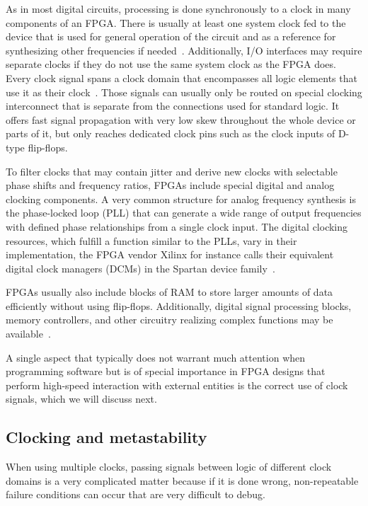 \documentclass[a4paper, 11pt, oneside]{Thesis}  %
\begin{document}
As in most digital circuits, processing is done synchronously to a clock in many components of an FPGA. There is usually at least one system clock fed to the device that is used for general operation of the circuit and as a reference for synthesizing other frequencies if needed~\cite{DigSysDesign}. Additionally, I/O interfaces may require separate clocks if they do not use the same system clock as the FPGA does. Every clock signal spans a clock domain that encompasses all logic elements that use it as their clock~\cite{AdvFPGA}. Those signals can usually only be routed on special clocking interconnect that is separate from the connections used for standard logic. It offers fast signal propagation with very low skew throughout the whole device or parts of it, but only reaches dedicated clock pins such as the clock inputs of D-type flip-flops.

To filter clocks that may contain jitter and derive new clocks with selectable phase shifts and frequency ratios, FPGAs include special digital and analog clocking components. A very common structure for analog frequency synthesis is the phase-locked loop (PLL) that can generate a wide range of output frequencies with defined phase relationships from a single clock input. The digital clocking resources, which fulfill a function similar to the PLLs, vary in their implementation, the FPGA vendor Xilinx for instance calls their equivalent digital clock managers (DCMs) in the Spartan device family~\cite{S6Clocking}.

FPGAs usually also include blocks of RAM to store larger amounts of data efficiently without using flip-flops. Additionally, digital signal processing blocks, memory controllers, and other circuitry realizing complex functions may be available~\cite{DigSysDesign}.

A single aspect that typically does not warrant much attention when programming software but is of special importance in FPGA designs that perform high-speed interaction with external entities is the correct use of clock signals, which we will discuss next.

\subsection{Clocking and metastability}

When using multiple clocks, passing signals between logic of different clock domains is a very complicated matter because if it is done wrong, non-repeatable failure conditions can occur that are very difficult to debug.
\end{document}
